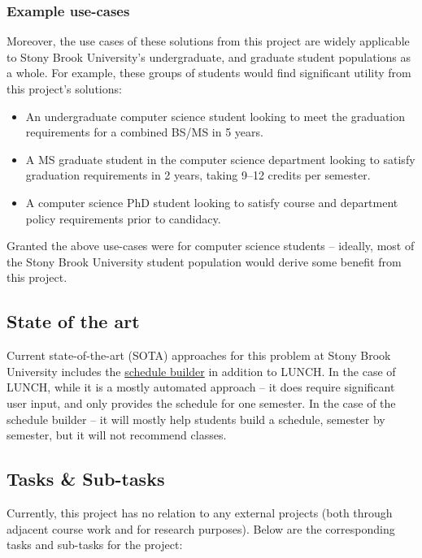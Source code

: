 \documentclass[12pt]{article}
\begin{document}
    \subsubsection{Example use-cases}
    \label{subsubsec:example}
    Moreover, the use cases of these solutions from this project are widely applicable to Stony Brook University's undergraduate, and graduate student populations as a whole. For example, these groups of students would find significant utility from this project's solutions:
    \begin{itemize}
        \item An undergraduate computer science student looking to meet the graduation requirements for a combined BS/MS in 5 years.
        \item A MS graduate student in the computer science department looking to satisfy graduation requirements in 2 years, taking 9--12 credits per semester.
        \item A computer science PhD student looking to satisfy course and department policy requirements prior to candidacy.
    \end{itemize}

    Granted the above use-cases were for computer science students -- ideally, most of the Stony Brook University student population would derive some benefit from this project.

    \subsection{State of the art}
    \label{subsec:sota}
    Current state-of-the-art (SOTA) approaches for this problem at Stony Brook University includes the \href{https://you.stonybrook.edu/uaamedia/schedulebuilder/}{schedule builder} in addition to LUNCH\cite{lunch2023}. In the case of LUNCH, while it is a mostly automated approach -- it does require significant user input, and only provides the schedule for one semester. In the case of the schedule builder -- it will mostly help students build a schedule, semester by semester\cite{sched}, but it will not recommend classes.

    \subsection{Tasks \& Sub-tasks}
    \label{subsec:tasks}
    Currently, this project has no relation to any external projects (both through adjacent course work and for research purposes). Below are the corresponding tasks and sub-tasks for the project:
\end{document}
